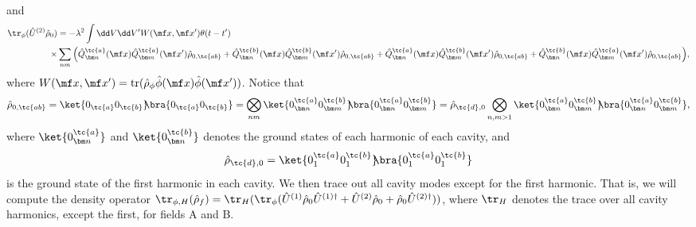 {{\begin{align}
\end{align}}
and{\footnotesize
\begin{align}
    \tr_\phi(\hat{U}^{(2)}\hat{\rho}_0) &= - \lambda^2\int \dd V \dd V' W(\mf x, \mf x')\theta(t-t')  \nonumber\\\times&\sum_{nm} \Big( \hat{Q}^{\tc{a}}_{\bm n}(\mf x)\hat{Q}^{\tc{a}}_{\bm m}(\mf x')\hat{\rho}_{0,\tc{ab}}+ \hat{Q}^\tc{b}_{\bm n}(\mf x)\hat{Q}_{\bm m}^{\tc{b}}(\mf x')\hat{\rho}_{0,\tc{ab}}+  \hat{Q}^\tc{a}_{\bm n}(\mf x)\hat{Q}^\tc{b}_{\bm m}(\mf x')\hat{\rho}_{0,\tc{ab}} +  \hat{Q}^\tc{b}_{\bm n}(\mf x) \hat{Q}^\tc{a}_{\bm m}(\mf x')\hat{\rho}_{0,\tc{ab}}\Big),
\end{align}}
where $W(\mf x, \mf x') = \text{tr}(\hat{\rho}_\phi \hat{\phi}(\mf x) \hat{\phi}(\mf x'))$. Notice that 
\begin{equation}
    \hat{\rho}_{0,\tc{ab}} = \ket{0_\tc{a}0_\tc{b}}\!\!\bra{0_\tc{a}0_\tc{b}} = \bigotimes_{nm} \ket{0_{\bm n}^\tc{a}0_{\bm m}^\tc{b}}\!\!\bra{0_{\bm n}^\tc{a}0_{\bm m}^\tc{b}} = \hat{\rho}_{\tc{d},0}\bigotimes_{n,m>1} \ket{0_{\bm n}^\tc{a}0_{\bm m}^\tc{b}}\!\!\bra{0_{\bm n}^\tc{a}0_{\bm m}^\tc{b}},
\end{equation}
where $\ket{0_{\bm n}^{\tc{a}}}$ and $\ket{0_{\bm n}^{\tc{b}}}$ denotes the ground states of each harmonic of each cavity, and 
\begin{equation}
    \hat{\rho}_{\tc{d},0} = \ket{0_1^\tc{a}0_1^\tc{b}}\!\!\bra{0_1^\tc{a}0_1^\tc{b}}
\end{equation}
is the ground state of the first harmonic in each cavity. We then trace out all cavity modes except for the first harmonic. That is, we will compute the density operator \mbox{$\tr_{\phi,H}(\hat{\rho}_f) = \tr_H(\tr_\phi(\hat{U}^{(1)}\hat{\rho}_0\hat{U}^{(1)\dagger}+ \hat{U}^{(2)}\hat{\rho}_0 + \hat{\rho}_0 \hat{U}^{(2)\dagger}))$}, where $\tr_H$ denotes the trace over all cavity harmonics, except the first, for fields A and B.

}
